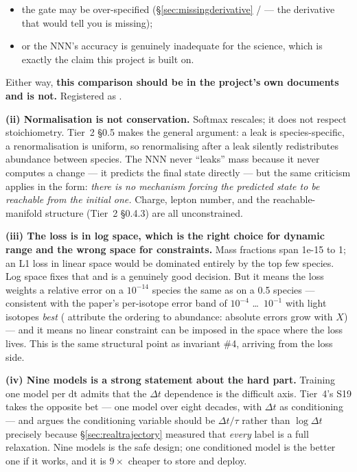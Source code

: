 \begin{itemize}
\item the gate may be over-specified (\S\ref{sec:missingderivative} /
   --- the derivative that would tell you is missing);
\item or the NNN's \Ye{} accuracy is genuinely inadequate for the science,
  which is exactly the claim this project is built on.
\end{itemize}

Either way, \textbf{this comparison should be in the project's own documents
and is not.} Registered as .

\textbf{(ii) Normalisation is not conservation.} Softmax rescales; it does not
respect stoichiometry. Tier~2 \S 0.5 makes the general argument: a leak is
species-specific, a renormalisation is uniform, so renormalising after a leak
silently redistributes abundance between species. The NNN never ``leaks'' mass
because it never computes a change --- it predicts the final state directly ---
but the same criticism applies in the form: \emph{there is no mechanism forcing
the predicted state to be reachable from the initial one.} Charge, lepton
number, and the reachable-manifold structure (Tier~2 \S 0.4.3) are all
unconstrained.

\textbf{(iii) The loss is in log space, which is the right choice for dynamic
range and the wrong space for constraints.} Mass fractions span 1e-15 to 1; an
L1 loss in linear space would be dominated entirely by the top few species. Log
space fixes that and is a genuinely good decision. But it means the loss
weights a relative error on a $10^{-14}$ species the same as on a 0.5
species --- consistent with the paper's per-isotope error band of $10^{-4}$
\ldots\ $10^{-1}$ with light isotopes \emph{best} (\citealt[\S 3]{grichener2025}
attribute the ordering to abundance: absolute errors grow with $X$) --- and it
means no linear constraint can be imposed in the space where the loss lives.
This is the same structural point as invariant \#4, arriving from the loss
side.

\textbf{(iv) Nine models is a strong statement about the hard part.} Training
one model per dt admits that the $\Delta t$ dependence is the difficult axis.
Tier~4's S19 takes the opposite bet --- one model over eight decades, with
$\Delta t$ as conditioning --- and  argues the conditioning
variable should be $\Delta t/\tau$ rather than $\log\Delta t$ precisely because
\S\ref{sec:realtrajectory} measured that \emph{every} label is a full
relaxation. Nine models is the safe design; one conditioned model is the better
one if it works, and it is $9\times$ cheaper to store and deploy.

